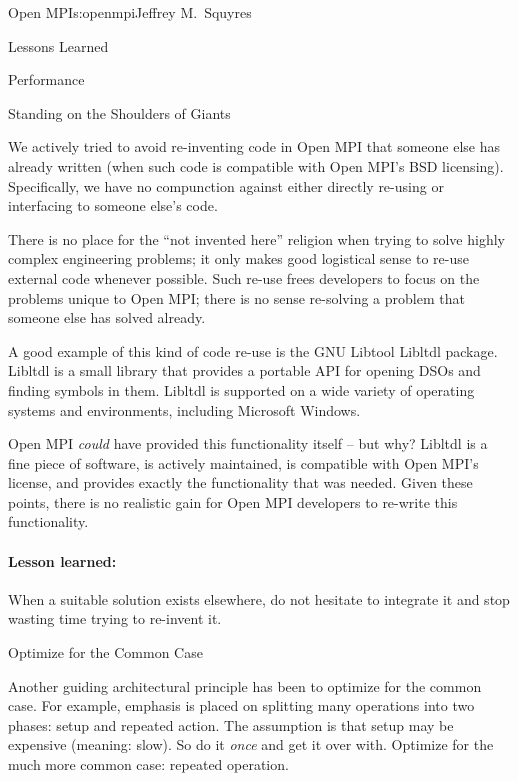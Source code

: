 \begin{aosachapter}{Open MPI}{s:openmpi}{Jeffrey M.\ Squyres}
\begin{aosasect1}{Lessons Learned}
\begin{aosasect2}{Performance}
\end{aosasect2}


\begin{aosasect2}{Standing on the Shoulders of Giants}

We actively tried to avoid re-inventing code in Open MPI that someone
else has already written (when such code is compatible with Open
MPI's BSD licensing).
%
Specifically, we have no compunction against either directly re-using
or interfacing to someone else's code.

There is no place for the ``not invented here'' religion when trying
to solve highly complex engineering problems; it only makes good
logistical sense to re-use external code whenever possible.
%
Such re-use frees developers to focus on the problems unique to Open
MPI; there is no sense re-solving a problem that someone else has
solved already.

A good example of this kind of code re-use is the GNU Libtool Libltdl
package.  Libltdl is a small library that provides a portable API for
opening DSOs and finding symbols in them.  Libltdl is supported on a
wide variety of operating systems and environments, including
Microsoft Windows.

Open MPI \emph{could} have provided this functionality itself -- but
why?
%
Libltdl is a fine piece of software, is actively maintained, is
compatible with Open MPI's license, and provides exactly the
functionality that was needed.
%
Given these points, there is no realistic gain for Open MPI developers
to re-write this functionality.


\paragraph{Lesson learned:} 

When a suitable solution exists elsewhere, do not hesitate to integrate
it and stop wasting time trying to re-invent it.

\end{aosasect2}


\begin{aosasect2}{Optimize for the Common Case}

Another guiding architectural principle has been to optimize for the
common case.  
% 
For example, emphasis is placed on splitting many operations into two
phases: setup and repeated action.  The assumption is that setup may
be expensive (meaning: slow).  So do it \emph{once} and get it over
with.
%
Optimize for the much more common case: repeated operation.


\end{aosasect2}
\end{aosasect1}
\end{aosachapter}
